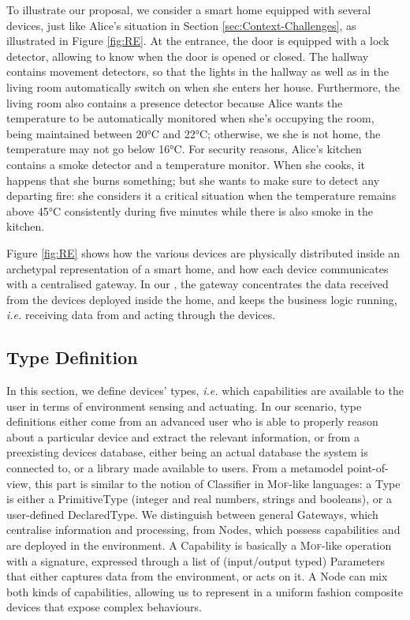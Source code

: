 To illustrate our proposal, we consider a smart home equipped with several devices, just like Alice's situation in Section \ref{sec:Context-Challenges}, as illustrated in Figure \ref{fig:RE}. At the entrance, the door is equipped with a lock detector, allowing to know when the door is opened or closed. The hallway contains movement detectors, so that the lights in the hallway as well as in the living room automatically switch on when she enters her house. Furthermore, the living room also contains a presence detector because Alice wants the temperature to be automatically monitored when she's occupying the room, being maintained between 20°C and 22°C; otherwise, we she is not home, the temperature may not go below 16°C. For security reasons, Alice's kitchen contains a smoke detector and a temperature monitor. When she cooks, it happens that she burns something; but she wants to make sure to detect any departing fire: she considers it a critical situation when the temperature remains above 45°C consistently during five minutes while there is also smoke in the kitchen. 

Figure \ref{fig:RE} shows how the various devices are physically distributed inside an archetypal representation of a smart home, and how each device communicates with a centralised gateway. In our \DSL, the gateway concentrates the data received from the devices deployed inside the home, and keeps the business logic running, \textit{i.e.} receiving data from and acting through the devices. 

\subsection{Type Definition}
\label{sec:IoTDSL-Type}

In this section, we define \IOT devices' types, \textit{i.e.} which capabilities are available to the user in terms of environment sensing and actuating. In our scenario, type definitions either come from an advanced user who is able to properly reason about a particular device and extract the relevant information, or from a preexisting devices database, either being an actual database the system is connected to, or a library made available to users. From a metamodel point-of-view, this part is similar to the notion of \textsf{Classifier} in \textsc{Mof}-like languages: a \textsf{Type} is either a \textsf{PrimitiveType} (integer and real numbers, strings and booleans), or a user-defined \textsf{DeclaredType}. We distinguish between general \textsf{Gateway}s, which centralise information and processing, from \textsf{Node}s, which possess capabilities and are deployed in the environment. A \textsf{Capability} is basically a \textsc{Mof}-like operation with a signature, expressed through a list of (input/output typed) \textsf{Parameter}s that either captures data from the environment, or acts on it. A \textsf{Node} can mix both kinds of capabilities, allowing us to represent in a uniform fashion composite devices that expose complex behaviours.
	
